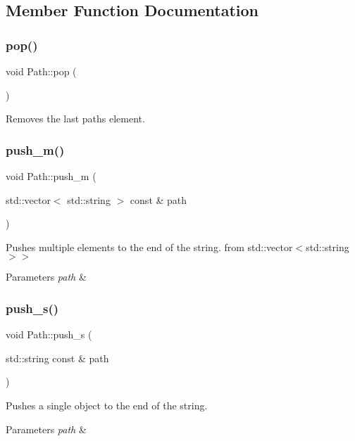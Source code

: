 \subsection{Member Function Documentation}
\mbox{\label{class_path_a0f02b5b2384900e3fe1c3efadea6c0ca}} 
\subsubsection{\texorpdfstring{pop()}{pop()}}
{\footnotesize\ttfamily void Path\+::pop (\begin{DoxyParamCaption}{ }\end{DoxyParamCaption})}

Removes the last paths element. \mbox{\label{class_path_a32a30af9ac4989b875079b01ff9d2825}} 
\subsubsection{\texorpdfstring{push\+\_\+m()}{push\_m()}}
{\footnotesize\ttfamily void Path\+::push\+\_\+m (\begin{DoxyParamCaption}\item[{std\+::vector$<$ std\+::string $>$ const \&}]{path }\end{DoxyParamCaption})}

Pushes multiple elements to the end of the string. from std\+::vector$<$std\+::string$>$$>$ 
\begin{DoxyParams}{Parameters}
{\em path} & \\
\hline
\end{DoxyParams}
\mbox{\label{class_path_af270e6e39de7389980e4c6d0cf9fdd37}} 
\subsubsection{\texorpdfstring{push\+\_\+s()}{push\_s()}}
{\footnotesize\ttfamily void Path\+::push\+\_\+s (\begin{DoxyParamCaption}\item[{std\+::string const \&}]{path }\end{DoxyParamCaption})}

Pushes a single object to the end of the string. 
\begin{DoxyParams}{Parameters}
{\em path} & \\
\hline
\end{DoxyParams}
\mbox{\label{class_path_a7c1a4772ea53d546d9cd2dad199fd633}} 
